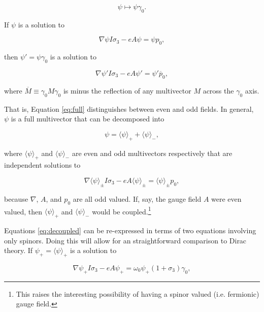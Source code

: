 \documentclass{article}
\begin{document}
  \begin{equation}
    \psi \mapsto \psi \gamma_0.\label{eq:g0conjugation}
  \end{equation}

  If $\psi$ is a solution to

  \begin{equation}
    \nabla \psi I \sigma_3 - e A \psi = \psi p_0,\label{eq:plus}
  \end{equation}

  then $\psi' = \psi \gamma_0$ is a solution to

  \begin{equation}
    \nabla \psi' I \sigma_3 - e A \psi' = \psi' \overline p_0, \label{eq:minus}
  \end{equation}

  where $\overline M \equiv \gamma_0 M\gamma_0$ is minus the reflection of any multivector $M$ across the $\gamma_0$ axis.

  That is, Equation \ref{eq:full} distinguishes between even and odd fields. In general, $\psi$ is a full multivector that can be decomposed into

  \begin{equation}
    \psi = \langle \psi \rangle_+ + \langle \psi \rangle_-,
  \end{equation}

  where $\langle \psi \rangle_+$ and $\langle \psi \rangle_-$ are even and odd multivectors respectively that are independent solutions to

  \begin{equation}
    \nabla \langle \psi \rangle_\pm I \sigma_3 - e A \langle \psi \rangle_\pm = \langle \psi \rangle_\pm p_0,\label{eq:decoupled}
  \end{equation}

  because $\nabla$, $A$, and $p_0$ are all odd valued. If, say, the gauge field $A$ were even valued, then $\langle \psi \rangle_+$ and $\langle \psi \rangle_-$ would be coupled.\footnote{This raises the interesting possibility of having a spinor valued (i.e. fermionic) gauge field.}

  Equations \ref{eq:decoupled} can be re-expressed in terms of two equations involving only spinors. Doing this will allow for an straightforward comparison to Dirac theory. If $\psi_+ = \langle \psi \rangle_+$ is a solution to

  \begin{equation}
    \nabla \psi_+ I \sigma_3 - e A \psi_+ = \omega_0 \psi_+ (1 + \sigma_3) \gamma_0,\label{eq:even}
  \end{equation}
\end{document}

